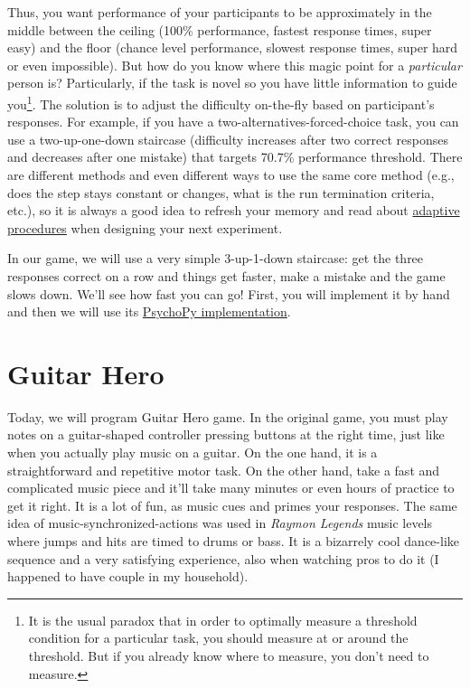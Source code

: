 \documentclass[
]{book}
\begin{document}
Thus, you want performance of your participants to be approximately in the middle between the ceiling (100\% performance, fastest response times, super easy) and the floor (chance level performance, slowest response times, super hard or even impossible). But how do you know where this magic point for a \emph{particular} person is? Particularly, if the task is novel so you have little information to guide you\footnote{It is the usual paradox that in order to optimally measure a threshold condition for a particular task, you should measure at or around the threshold. But if you already know where to measure, you don't need to measure.}. The solution is to adjust the difficulty on-the-fly based on participant's responses. For example, if you have a two-alternatives-forced-choice task, you can use a two-up-one-down staircase (difficulty increases after two correct responses and decreases after one mistake) that targets 70.7\% performance threshold. There are different methods and even different ways to use the same core method (e.g., does the step stays constant or changes, what is the run termination criteria, etc.), so it is always a good idea to refresh your memory and read about \href{https://doi.org/10.3758/BF03194543}{adaptive procedures} when designing your next experiment.

In our game, we will use a very simple 3-up-1-down staircase: get the three responses correct on a row and things get faster, make a mistake and the game slows down. We'll see how fast you can go! First, you will implement it by hand and then we will use its \href{https://psychopy.org/api/data.html\#stairhandler}{PsychoPy implementation}.

\hypertarget{guitar-hero}{%
\section{Guitar Hero}\label{guitar-hero}}

Today, we will program Guitar Hero game. In the original game, you must play notes on a guitar-shaped controller pressing buttons at the right time, just like when you actually play music on a guitar. On the one hand, it is a straightforward and repetitive motor task. On the other hand, take a fast and complicated music piece and it'll take many minutes or even hours of practice to get it right. It is a lot of fun, as music cues and primes your responses. The same idea of music-synchronized-actions was used in \emph{Raymon Legends} music levels where jumps and hits are timed to drums or bass. It is a bizarrely cool dance-like sequence and a very satisfying experience, also when watching pros to do it (I happened to have couple in my household).
\end{document}
